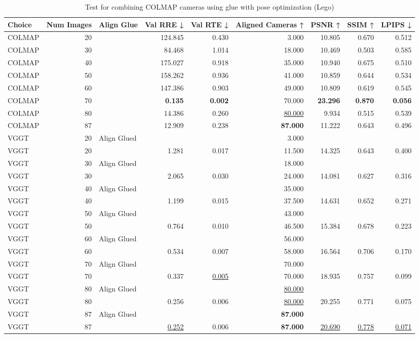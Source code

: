 \begin{table}[H]
\caption{Test for combining COLMAP cameras using glue with pose optimization (Lego)}
\label{tab:99_align_glue_pose_opt_lego}
\begin{tabular}{lrlrrrrrr}
\toprule
Choice & Num Images & Align Glue & Val RRE ↓ & Val RTE ↓ & Aligned Cameras ↑ & PSNR ↑ & SSIM ↑ & LPIPS ↓ \\
\midrule
COLMAP & 20 &  & 124.845 & 0.430 & 3.000 & 10.805 & 0.670 & 0.512 \\
COLMAP & 30 &  & 84.468 & 1.014 & 18.000 & 10.469 & 0.503 & 0.585 \\
COLMAP & 40 &  & 175.027 & 0.918 & 35.000 & 10.940 & 0.675 & 0.510 \\
COLMAP & 50 &  & 158.262 & 0.936 & 41.000 & 10.859 & 0.644 & 0.534 \\
COLMAP & 60 &  & 147.386 & 0.903 & 49.000 & 10.809 & 0.619 & 0.545 \\
COLMAP & 70 &  & \textbf{0.135} & \textbf{0.002} & 70.000 & \textbf{23.296} & \textbf{0.870} & \textbf{0.056} \\
COLMAP & 80 &  & 14.386 & 0.260 & \underline{80.000} & 9.934 & 0.515 & 0.539 \\
COLMAP & 87 &  & 12.909 & 0.238 & \textbf{87.000} & 11.222 & 0.643 & 0.496 \\
VGGT & 20 & Align Glued &  &  & 3.000 &  &  &  \\
VGGT & 20 &  & 1.281 & 0.017 & 11.500 & 14.325 & 0.643 & 0.400 \\
VGGT & 30 & Align Glued &  &  & 18.000 &  &  &  \\
VGGT & 30 &  & 2.065 & 0.030 & 24.000 & 14.081 & 0.627 & 0.316 \\
VGGT & 40 & Align Glued &  &  & 35.000 &  &  &  \\
VGGT & 40 &  & 1.199 & 0.015 & 37.500 & 14.631 & 0.652 & 0.271 \\
VGGT & 50 & Align Glued &  &  & 43.000 &  &  &  \\
VGGT & 50 &  & 0.764 & 0.010 & 46.500 & 15.384 & 0.678 & 0.223 \\
VGGT & 60 & Align Glued &  &  & 56.000 &  &  &  \\
VGGT & 60 &  & 0.534 & 0.007 & 58.000 & 16.564 & 0.706 & 0.170 \\
VGGT & 70 & Align Glued &  &  & 70.000 &  &  &  \\
VGGT & 70 &  & 0.337 & \underline{0.005} & 70.000 & 18.935 & 0.757 & 0.099 \\
VGGT & 80 & Align Glued &  &  & \underline{80.000} &  &  &  \\
VGGT & 80 &  & 0.256 & 0.006 & \underline{80.000} & 20.255 & 0.771 & 0.075 \\
VGGT & 87 & Align Glued &  &  & \textbf{87.000} &  &  &  \\
VGGT & 87 &  & \underline{0.252} & 0.006 & \textbf{87.000} & \underline{20.690} & \underline{0.778} & \underline{0.071} \\
\bottomrule
\end{tabular}
\end{table}
